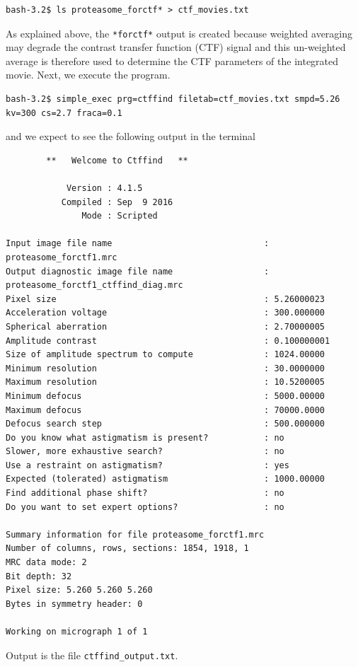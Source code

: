 \documentclass[a4paper,11pt]{article}
\begin{document}
\begin{verbatim}
bash-3.2$ ls proteasome_forctf* > ctf_movies.txt
\end{verbatim}
As explained above, the \texttt{*forctf*} output is created because weighted averaging may degrade the contrast transfer function (CTF) signal and this un-weighted average is therefore used to determine the CTF parameters of the integrated movie. Next, we execute the program.
\begin{verbatim}
bash-3.2$ simple_exec prg=ctffind filetab=ctf_movies.txt smpd=5.26
kv=300 cs=2.7 fraca=0.1
\end{verbatim}
and we expect to see the following output in the terminal
\begin{verbatim}
        **   Welcome to Ctffind   **

            Version : 4.1.5
           Compiled : Sep  9 2016
               Mode : Scripted

Input image file name                              : proteasome_forctf1.mrc
Output diagnostic image file name                  : proteasome_forctf1_ctffind_diag.mrc
Pixel size                                         : 5.26000023                      
Acceleration voltage                               : 300.000000                      
Spherical aberration                               : 2.70000005                      
Amplitude contrast                                 : 0.100000001                     
Size of amplitude spectrum to compute              : 1024.00000                      
Minimum resolution                                 : 30.0000000                      
Maximum resolution                                 : 10.5200005                      
Minimum defocus                                    : 5000.00000                      
Maximum defocus                                    : 70000.0000                      
Defocus search step                                : 500.000000                      
Do you know what astigmatism is present?           : no
Slower, more exhaustive search?                    : no
Use a restraint on astigmatism?                    : yes
Expected (tolerated) astigmatism                   : 1000.00000                      
Find additional phase shift?                       : no
Do you want to set expert options?                 : no

Summary information for file proteasome_forctf1.mrc
Number of columns, rows, sections: 1854, 1918, 1
MRC data mode: 2
Bit depth: 32
Pixel size: 5.260 5.260 5.260
Bytes in symmetry header: 0

Working on micrograph 1 of 1
\end{verbatim}
Output is the file \texttt{ctffind\_output.txt}.
\end{document}
